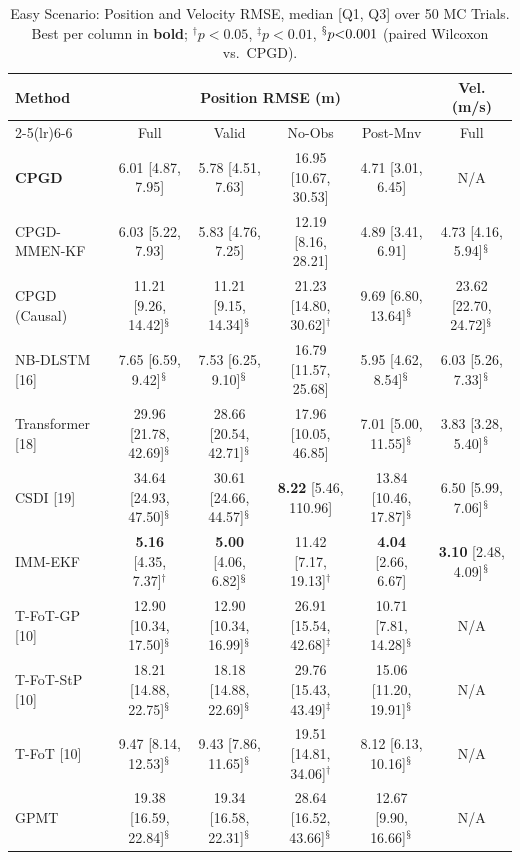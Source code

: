 \begin{table}[htbp]\centering
\caption{Easy Scenario: Position and Velocity RMSE, median [Q1, Q3] over 50 MC Trials. Best per column in \textbf{bold}; $^{\dagger}p{<}0.05$, $^{\ddagger}p{<}0.01$, $^{\mathsection}p{<}0.001$ (paired Wilcoxon vs.\ CPGD).}
\label{tab:easy_results}
\setlength{\tabcolsep}{4pt}
\centering\small\begin{tabular}{lccccc}
\toprule
\multirow{2}{*}{Method} & \multicolumn{4}{c}{Position RMSE (m)} & Vel. (m/s) \\
\cmidrule(lr){2-5}\cmidrule(lr){6-6}
& Full & Valid & No-Obs & Post-Mnv & Full \\
\midrule
\textbf{CPGD} & 6.01 [4.87, 7.95] & 5.78 [4.51, 7.63] & 16.95 [10.67, 30.53] & 4.71 [3.01, 6.45] & N/A \\
CPGD-MMEN-KF & 6.03 [5.22, 7.93] & 5.83 [4.76, 7.25] & 12.19 [8.16, 28.21] & 4.89 [3.41, 6.91] & 4.73 [4.16, 5.94]$^{\mathsection}$ \\
CPGD (Causal) & 11.21 [9.26, 14.42]$^{\mathsection}$ & 11.21 [9.15, 14.34]$^{\mathsection}$ & 21.23 [14.80, 30.62]$^{\dagger}$ & 9.69 [6.80, 13.64]$^{\mathsection}$ & 23.62 [22.70, 24.72]$^{\mathsection}$ \\
NB-DLSTM [16] & 7.65 [6.59, 9.42]$^{\mathsection}$ & 7.53 [6.25, 9.10]$^{\mathsection}$ & 16.79 [11.57, 25.68] & 5.95 [4.62, 8.54]$^{\mathsection}$ & 6.03 [5.26, 7.33]$^{\mathsection}$ \\
Transformer [18] & 29.96 [21.78, 42.69]$^{\mathsection}$ & 28.66 [20.54, 42.71]$^{\mathsection}$ & 17.96 [10.05, 46.85] & 7.01 [5.00, 11.55]$^{\mathsection}$ & 3.83 [3.28, 5.40]$^{\mathsection}$ \\
CSDI [19] & 34.64 [24.93, 47.50]$^{\mathsection}$ & 30.61 [24.66, 44.57]$^{\mathsection}$ & \textbf{8.22} [5.46, 110.96] & 13.84 [10.46, 17.87]$^{\mathsection}$ & 6.50 [5.99, 7.06]$^{\mathsection}$ \\
IMM-EKF & \textbf{5.16} [4.35, 7.37]$^{\dagger}$ & \textbf{5.00} [4.06, 6.82]$^{\mathsection}$ & 11.42 [7.17, 19.13]$^{\dagger}$ & \textbf{4.04} [2.66, 6.67] & \textbf{3.10} [2.48, 4.09]$^{\mathsection}$ \\
T-FoT-GP [10] & 12.90 [10.34, 17.50]$^{\mathsection}$ & 12.90 [10.34, 16.99]$^{\mathsection}$ & 26.91 [15.54, 42.68]$^{\ddagger}$ & 10.71 [7.81, 14.28]$^{\mathsection}$ & N/A \\
T-FoT-StP [10] & 18.21 [14.88, 22.75]$^{\mathsection}$ & 18.18 [14.88, 22.69]$^{\mathsection}$ & 29.76 [15.43, 43.49]$^{\ddagger}$ & 15.06 [11.20, 19.91]$^{\mathsection}$ & N/A \\
T-FoT [10] & 9.47 [8.14, 12.53]$^{\mathsection}$ & 9.43 [7.86, 11.65]$^{\mathsection}$ & 19.51 [14.81, 34.06]$^{\dagger}$ & 8.12 [6.13, 10.16]$^{\mathsection}$ & N/A \\
GPMT & 19.38 [16.59, 22.84]$^{\mathsection}$ & 19.34 [16.58, 22.31]$^{\mathsection}$ & 28.64 [16.52, 43.66]$^{\mathsection}$ & 12.67 [9.90, 16.66]$^{\mathsection}$ & N/A \\
\bottomrule
\end{tabular}
\end{table}
